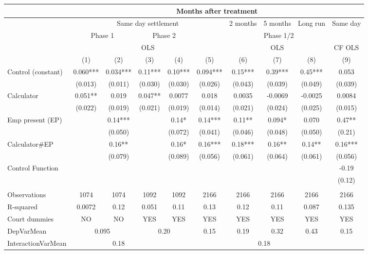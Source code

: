 \begin{tabular}{lccccccccc}
\toprule
\multicolumn{1}{|r}{} & \multicolumn{9}{c}{Months after treatment} \\
\midrule
\multicolumn{1}{r|}{} & \multicolumn{5}{c|}{Same day settlement} & \multicolumn{1}{c|}{2 months } & \multicolumn{1}{c|}{ 5 months} & \multicolumn{1}{c|}{Long run} & Same day  \\
\midrule
\midrule
\multicolumn{1}{r|}{} & \multicolumn{2}{c|}{Phase 1} & \multicolumn{2}{c|}{Phase 2} & \multicolumn{5}{c}{Phase 1/2} \\
\midrule
\multicolumn{1}{r|}{} & \multicolumn{5}{c|}{OLS}              & \multicolumn{3}{c|}{OLS} & CF OLS \\
\midrule
\midrule
      & (1)   & (2)   & (3)   & (4)   & (5)   & (6)   & (7)   & (8)   & (9) \\
\midrule
\midrule
Control (constant) & 0.060*** & 0.034*** & 0.11*** & 0.10*** & 0.094*** & 0.15*** & 0.39*** & 0.45*** & 0.053 \\
      & (0.013) & (0.011) & (0.030) & (0.030) & (0.026) & (0.043) & (0.039) & (0.049) & (0.039) \\
Calculator & 0.051** & 0.019 & 0.047** & 0.0077 & 0.018 & 0.0035 & -0.0069 & -0.0025 & 0.0084 \\
      & (0.022) & (0.019) & (0.021) & (0.019) & (0.014) & (0.021) & (0.024) & (0.025) & (0.015) \\
Emp present (EP) &       & 0.14*** &       & 0.14* & 0.14*** & 0.11** & 0.094* & 0.070 & 0.47** \\
      &       & (0.050) &       & (0.072) & (0.041) & (0.046) & (0.048) & (0.050) & (0.21) \\
Calculator\#EP &       & 0.16** &       & 0.16* & 0.16*** & 0.18*** & 0.16** & 0.14** & 0.16*** \\
      &       & (0.079) &       & (0.089) & (0.056) & (0.061) & (0.064) & (0.061) & (0.056) \\
Control Function &       &       &       &       &       &       &       &       & -0.19 \\
      &       &       &       &       &       &       &       &       & (0.12) \\
      &       &       &       &       &       &       &       &       &  \\
\midrule
Observations & 1074  & 1074  & 1092  & 1092  & 2166  & 2166  & 2166  & 2166  & 2166 \\
R-squared & 0.0072 & 0.12  & 0.051 & 0.11  & 0.13  & 0.12  & 0.11  & 0.087 & 0.135 \\
Court dummies  & NO    & NO    & YES   & YES   & YES   & YES   & YES   & YES   & YES \\
DepVarMean & \multicolumn{2}{c}{0.095} & \multicolumn{2}{c}{0.20} & 0.15  & 0.19  & 0.32  & 0.43  & 0.15 \\
InteractionVarMean &       & 0.18  &       & \multicolumn{6}{c}{0.18} \\
\bottomrule
\bottomrule
\end{tabular}%

